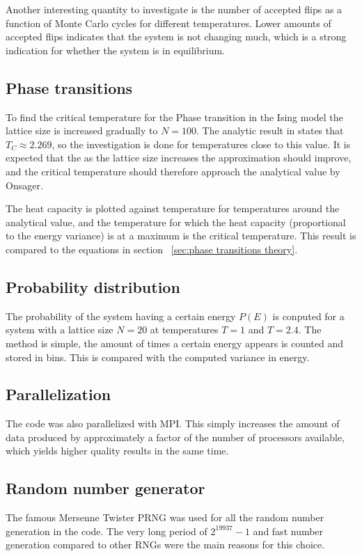 \documentclass[aps,reprint]{revtex4-1}
\begin{document}
Another interesting quantity to investigate is the number of accepted flips as
a function of Monte Carlo cycles for different temperatures. Lower amounts of
accepted flips indicates that the system is not changing much, which is a strong
indication for whether the system is in equilibrium.
\subsection{Phase transitions} \label{sec:phase transitions}
To find the critical temperature for the Phase transition in the Ising model
the lattice size is increased gradually to $N = 100$. The analytic result in
\cite{onsager} states that $T_C \approx 2.269$, so the investigation is done
for temperatures close to this value. It is expected that the as the lattice size
increases the approximation should improve, and the critical temperature should
therefore approach the analytical value by Onsager.

The heat capacity is plotted against temperature for temperatures around the
analytical value, and the temperature for which the heat capacity (proportional
to the energy variance) is at a maximum is the critical temperature. This result
is compared to the equations in section ~\ref{sec:phase transitions theory}.

\subsection{Probability distribution}
The probability of the system having a certain energy $P(E)$ is conputed
for a system with a lattice size $N = 20$ at temperatures $T = 1$ and $T = 2.4$.
The method is simple, the amount of times a certain energy appears is counted
and stored in bins. This is compared with the computed variance in energy.

\subsection{Parallelization}
The code was also parallelized with MPI. This simply increases the amount of
data produced by approximately a factor of the number of processors available,
which yields higher quality results in the same time.

\subsection{Random number generator}
The famous Mersenne Twister PRNG was used for all the random number generation
in the code. The very long period of $2^{19937} - 1$ and fast number generation
compared to other RNGs were the main reasons for this choice.
\end{document}
